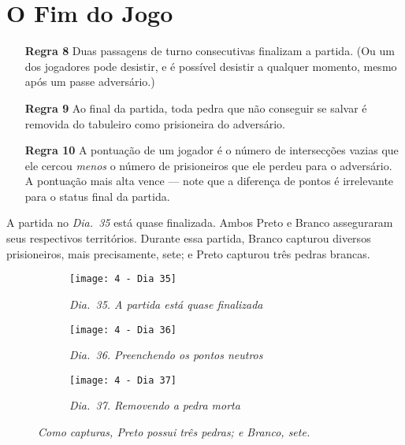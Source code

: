 \chapter{O Fim do Jogo}

\begin{itemize}
    \item[\textbf{Regra 8}] Duas passagens de turno consecutivas finalizam a partida. (Ou um dos jogadores pode desistir, e é possível desistir a qualquer momento, mesmo após um passe adversário.)
    \item[\textbf{Regra 9}] Ao final da partida, toda pedra que não conseguir se salvar é removida do tabuleiro como prisioneira do adversário.
    \item[\textbf{Regra 10}] A pontuação de um jogador é o número de intersecções vazias que ele cercou \emph{menos} o número de prisioneiros que ele perdeu para o adversário. A pontuação mais alta vence --- note que a diferença de pontos é irrelevante para o status final da partida.
\end{itemize}

\pagebreak

A partida no \emph{Dia.\@~35} está quase finalizada. Ambos Preto e Branco asseguraram seus respectivos territórios. Durante essa partida, Branco capturou diversos prisioneiros, mais precisamente, sete; e Preto capturou três pedras brancas.

\begin{figure}[h!]
    \centering
    \begin{subfigure}[t]{.3\textwidth}
        \centering
        \texttt{[image: 4 - Dia 35]}
        \caption*{\emph{Dia.\@~35. A partida está quase finalizada}}
    \end{subfigure}
    \hfill
    \begin{subfigure}[t]{.3\textwidth}
        \centering
        \texttt{[image: 4 - Dia 36]}
        \caption*{\emph{Dia.\@~36. Preenchendo os pontos neutros}}
    \end{subfigure}
    \hfill
    \begin{subfigure}[t]{.3\textwidth}
        \centering
        \texttt{[image: 4 - Dia 37]}
        \caption*{\emph{Dia.\@~37. Removendo a pedra morta}}
    \end{subfigure}
    \vspace*{.5cm}
    \captionsetup{justification=centering}
    \caption*{\emph{Como capturas, Preto possui três pedras; e Branco, sete.}}
\end{figure}
 
